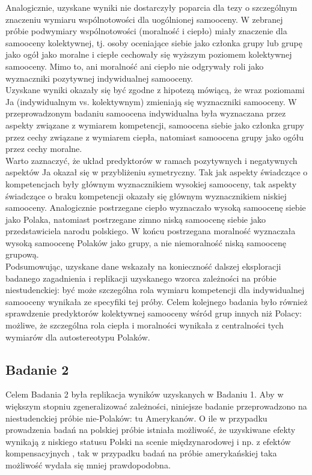 \documentclass[man]{apa6}
\begin{document}
Analogicznie, uzyskane wyniki nie dostarczyły poparcia dla tezy o szczególnym znaczeniu wymiaru wspólnotowości dla uogólnionej samooceny. W zebranej próbie podwymiary wspólnotowości (moralność i ciepło) miały znaczenie dla samooceny kolektywnej, tj. osoby oceniające siebie jako członka grupy lub grupę jako ogół jako moralne i ciepłe cechowały się wyższym poziomem kolektywnej samooceny. Mimo to, ani moralność ani ciepło nie odgrywały roli jako wyznaczniki pozytywnej indywidualnej samooceny.\\

Uzyskane wyniki okazały się być zgodne z hipotezą mówiącą, że wraz poziomami Ja (indywidualnym vs. kolektywnym) zmieniają się wyznaczniki samooceny. W przeprowadzonym badaniu samoocena indywidualna była wyznaczana przez aspekty związane z wymiarem kompetencji, samoocena siebie jako członka grupy przez cechy związane z wymiarem ciepła, natomiast samoocena grupy jako ogółu przez cechy moralne. \\

Warto zaznaczyć, że układ predyktorów w ramach pozytywnych i negatywnych aspektów Ja okazał się w przybliżeniu symetryczny. Tak jak aspekty świadczące o kompetencjach były głównym wyznacznikiem wysokiej samooceny, tak aspekty świadczące o braku kompetencji okazały się głównym wyznacznikiem niskiej samooceny. Analogicznie postrzegane ciepło wyznaczało wysoką samoocenę siebie jako Polaka, natomiast postrzegane zimno niską samoocenę siebie jako przedstawiciela narodu polskiego. W końcu postrzegana moralność wyznaczała wysoką samoocenę Polaków jako grupy, a nie niemoralność niską samoocenę grupową. \\

Podsumowując, uzyskane dane wskazały na konieczność dalszej eksploracji badanego zagadnienia i replikacji uzyskanego wzorca zależności na próbie niestudenckiej: być może szczególna rola wymiaru kompetencji dla indywidualnej samooceny wynikała ze specyfiki tej próby. Celem kolejnego badania było również sprawdzenie predyktorów kolektywnej samooceny wśród grup innych niż Polacy: możliwe, że szczególna rola ciepła i moralności wynikała z centralności tych wymiarów dla autostereotypu Polaków. \\

\newpage
\subsection{Badanie 2}
Celem Badania 2 była replikacja wyników uzyskanych w Badaniu 1. Aby w większym stopniu zgeneralizować zależności, niniejsze badanie przeprowadzono na niestudenckiej próbie nie-Polaków: tu Amerykanów. O ile w przypadku prowadzenia badań na polskiej próbie istniała możliwość, że uzyskiwane efekty wynikają z niskiego statusu Polski na scenie międzynarodowej i np. z efektów kompensacyjnych \parencite[zob. np.][]{judd2005fundamental}, tak w przypadku badań na próbie amerykańskiej taka możliwość wydała się mniej prawdopodobna.\\
\end{document}
